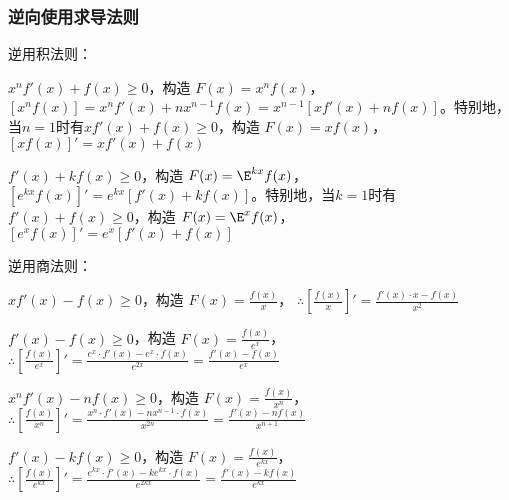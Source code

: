 
\subsubsection{逆向使用求导法则}

逆用积法则：

$x^n f'(x) + f(x) \geq 0$，构造 $F(x) = x^n f(x)$，$[x^n f(x)] = x^n f'(x) + nx^{n-1} f(x) = x^{n-1} [x f'(x) + nf(x)]$。特别地，当$n=1$时有$x f'(x) + f(x) \geq 0$，构造 $F(x) = x f(x)$，$[x f(x)]' = x f'(x) + f(x)$

$f'(x) + k f(x) \geq 0$，构造 $F(x) = \E^{kx} f(x)$，$[e^{kx} f(x)]' = e^{kx} [f'(x) + kf(x)]$。特别地，当$k=1$时有$f'(x) + f(x) \geq 0$，构造 $F(x) = \E^x f(x)$，$[e^x f(x)]' = e^x [f'(x) + f(x)]$

逆用商法则：

$xf'(x) - f(x) \geq 0$，构造 $F(x) = \frac{f(x)}{x}$，  
    $\therefore \left[\frac{f(x)}{x}\right]' = \frac{f'(x) \cdot x - f(x)}{x^2}$

$f'(x) - f(x) \geq 0$，构造 $F(x) = \frac{f(x)}{e^x}$，  
    $\therefore \left[\frac{f(x)}{e^x}\right]' = \frac{e^x \cdot f'(x) - e^x \cdot f(x)}{e^{2x}} = \frac{f'(x) - f(x)}{e^x}$

$x^n f'(x) - n f(x) \geq 0$，构造 $F(x) = \frac{f(x)}{x^n}$，  
    $\therefore \left[\frac{f(x)}{x^n}\right]' = \frac{x^n \cdot f'(x) - n x^{n-1} \cdot f(x)}{x^{2n}} = \frac{f'(x) - n f(x)}{x^{n+1}}$

$f'(x) - k f(x) \geq 0$，构造 $F(x) = \frac{f(x)}{e^{kx}}$，  
    $\therefore \left[\frac{f(x)}{e^{kx}}\right]' = \frac{e^{kx} \cdot f'(x) - k e^{kx} \cdot f(x)}{e^{2kx}} = \frac{f'(x) - k f(x)}{e^{kx}}$

